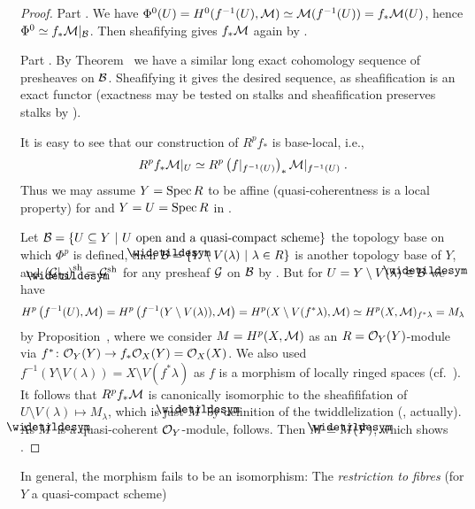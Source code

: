 \documentclass[a4paper,parskip=half,numbers=enddot, DIV=12]{scrreprt}
\begin{document}
 \begin{proof}
 	Part . We have $\Phi^0(U)=H^0(f^{-1}(U),\mathcal{M})\simeq \mathcal{M}(f^{-1}(U))=f_*\mathcal{M}(U)$, hence $\Phi^0\simeq f_*\mathcal{M}|_{\mathcal{B}}$. Then sheafifying gives $f_*\mathcal{M}$ again by \cite[Proposition~1.2.1,]{alggeo1}.
 	
 	Part . By Theorem~ we have a similar long exact cohomology sequence of presheaves on $\mathcal{B}$. Sheafifying it gives the desired sequence, as sheafification  is an exact functor (exactness may be tested on stalks and sheafification preserves stalks by \cite[Proposition1.2.1]{alggeo1}).
 	
 	It is easy to see that our construction of $R^pf_*$ is base-local, i.e.,
 	\begin{align*}
 		R^pf_*\mathcal{M}|_U\simeq R^p\left(f|_{f^{-1}(U)}\right)_*\mathcal{M}|_{f^{-1}(U)}\;.
 	\end{align*}
 	Thus we may assume $Y=\operatorname{Spec} R$ to be affine (quasi-coherentness is a local property) for  and $Y=U=\operatorname{Spec} R$ in . 
 	
 	Let $\mathcal{B}=\left\{U\subseteq Y\ \middle|\  U\text{ open and a quasi-compact scheme}\right\}$ the topology base on which $\Phi^p$ is defined, then $\snake{\Bb}=\left\{Y\setminus V(\lambda)\st\lambda\in R\right\}$ is another topology base of $Y$, and $\left(\Gg|_{\snake{\Bb}}\right)^\sh=\Gg^\sh$ for any presheaf $\mathcal{G}$ on $\mathcal{B}$ by \cite[Proposition~1.2.1]{alggeo1}. But for $U=Y\setminus V(\lambda)\in\snake{\Bb}$ we have
 	\begin{align*}
 		H^p\left(f^{-1}(U),\mathcal{M}\right)=H^p\left(f^{-1}(Y\setminus V(\lambda)),\mathcal{M}\right)= H^p(X\setminus V(f^*\lambda),\mathcal{M})\simeq H^p(X,\mathcal{M})_{f^*\lambda} =M_\lambda
 	\end{align*}
 	by Proposition~, where we consider $M=H^p(X,\mathcal{M})$ as an $R=\mathcal{O}_Y(Y)$-module via $f^*\colon \Oo_Y(Y)\morphism f_*\Oo_X(Y)=\Oo_X(X)$. We also used $f^{-1}(Y\setminus V(\lambda))=X\setminus V(f^*\lambda)$ as $f$ is a morphism of locally ringed spaces (cf.\ \cite[Definition~1.3.4]{alggeo1}). It follows that $R^pf_*\mathcal{M}$ is canonically isomorphic to the sheafififation of $U\setminus V(\lambda)\mapsto M_\lambda$, which is just $\snake{M}$ by definition of the twiddlelization (\cite[Definition~1.5.1]{alggeo1}, actually). As $\snake{M}$ is a quasi-coherent $\mathcal{O}_Y$-module,  follows. Then $M\simeq \snake{M}(Y)$, which shows .
 \end{proof}
 In general, the morphism  fails to be an isomorphism: The \emph{restriction to fibres} (for $Y$ a quasi-compact scheme)
\end{document}
